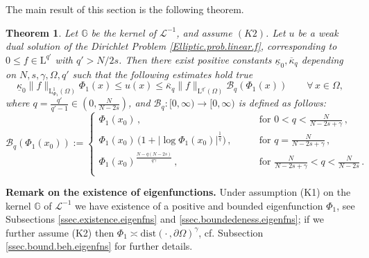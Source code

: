 \documentclass[11pt]{article}
\newtheorem{thm}{Theorem}[section]
\numberwithin{equation}{section}
\def\LL{\mathrm{L}} %
\newcommand{\AI}{\mathcal{L}^{-1}}
\newcommand{\ka}{\overline{\kappa}}
\newcommand{\kb}{\underline{\kappa}}
\newcommand{\K}{{\mathbb G}}
\newcommand{\B}{\mathcal{B}}
\def\dist{\mathrm{dist}} %
\begin{document}
The main result of this section is the following theorem.
\begin{thm}\label{Prop.Elliptic.prob.linear.f}
Let $\K$ be the kernel of $\AI$, and assume $(K2)$. Let $u$ be a weak dual solution of the Dirichlet Problem \eqref{Elliptic.prob.linear.f}, corresponding to $0\le f\in \LL^{q'}$ with $q'>N/2s$. Then there exist  positive constants $ \kb_0,\ka_q$ depending on $N,s,\gamma,\Omega,q'$ such that the following estimates hold true
\begin{equation}\label{Elliptic.prob.linear.f.estimates}
\kb_0 \|f\|_{\LL^1_{\Phi_1}(\Omega)} \Phi_1(x)\le u(x)\le\ka_q  \|f\|_{\LL^{q'}(\Omega)}\B_q(\Phi_1(x))\qquad \forall\,x \in \Omega,
\end{equation}
where $q=\frac{q'}{q'-1}\in \left(0,\frac{N}{N-2s}\right)$, and
$\B_q:[0,\infty)\to[0,\infty)$ is defined as follows:
\begin{equation}\label{Lem.Green.est.Upper.II.B}
\B_q(\Phi_1(x_0)):=\left\{\begin{array}{lll}
\Phi_1(x_0)\,, & \qquad\mbox{for }0< q <\frac{N}{N-2s+\gamma}\,,\\[2mm]
\Phi_1(x_0)\,\big(1+ \big|\log\Phi_1(x_0)\big|^{\frac{1}{q}}\big)\,, & \qquad\mbox{for }q = \frac{N}{N-2s+\gamma}\,,\\[2mm]
\Phi_1(x_0)^{\frac{N-q(N-2s)}{q\gamma}}\,, & \qquad\mbox{for }\frac{N}{N-2s+\gamma}<q<\frac{N}{N-2s}\,.\\
\end{array}\right.
\end{equation}
\end{thm}
\noindent\textbf{Remark on the existence of eigenfunctions. }Under assumption (K1) on the kernel $\K$ of $\AI$ we have existence of a positive and bounded eigenfunction $\Phi_1$,  see Subsections  \ref{ssec.existence.eigenfns} and \ref{ssec.boundedeness.eigenfns}; if we further assume (K2) then $\Phi_1\asymp \dist(\cdot\,, \partial\Omega)^\gamma$, cf. Subsection \ref{ssec.bound.beh.eigenfns} for further details.
\end{document}
